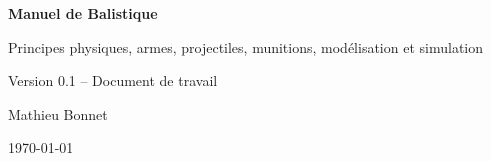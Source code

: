 \documentclass[a4paper,11pt]{book}
\title{\mytitle}
\author{\myauthor}
\date{\mydate}
\begin{document}
\pagestyle{fancy}

\begin{titlepage}

\centering

\vspace*{4cm}

{\Huge\bfseries Manuel de Balistique\par}

\vspace{1cm}

{\Large Principes physiques, armes, projectiles,
munitions, modélisation et simulation\par}

\vfill

{\Large Version 0.1 -- Document de travail\par}

\vspace{1cm}

Mathieu Bonnet

\vspace{1cm}

\today

\end{titlepage}

\frontmatter


\tableofcontents

\listoffigures

\listoftables

\mainmatter



%
%
%


%
\end{document}
